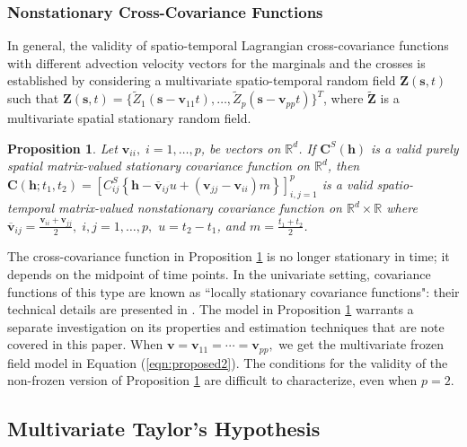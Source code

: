 \documentclass[12pt]{article}
\newcommand{\0}{\mathbf{0}}
\newtheorem{prop}{Proposition}
\begin{document}
\subsubsection{Nonstationary Cross-Covariance Functions}

In general, the validity of spatio-temporal Lagrangian cross-covariance functions with different advection velocity vectors for the marginals and the crosses is established by considering a multivariate spatio-temporal random field $\mathbf{Z}(\mathbf{s},t)$ such that $\mathbf{Z}(\mathbf{s},t)=\big\{\tilde{Z}_1\left(\mathbf{s}-\mathbf{v}_{11}t\right),\ldots,\tilde{Z}_p\left(\mathbf{s}-\mathbf{v}_{pp}t\right)\big\}^T$, where $\tilde{\mathbf{Z}}$ is a multivariate spatial stationary random field. 
\begin{prop}\label{corollary1}
Let $\mathbf{v}_{ii},\;i=1,\ldots,p$, be vectors on $\mathbb{R}^d$. If $\mathbf{C}^{S}(\mathbf{h})$ is a valid purely spatial matrix-valued stationary covariance function on $\mathbb{R}^d$, then $\mathbf{C}(\mathbf{h};t_1,t_2)=\left[C_{ij}^{S}\left\{\mathbf{h}-\overline{\mathbf{v}}_{ij}u+(\mathbf{v}_{jj}-\mathbf{v}_{ii})m\right\}\right]_{i,j=1}^{p}$ is a valid spatio-temporal matrix-valued nonstationary covariance function on $\mathbb{R}^d \times \mathbb{R}$ where $\overline{\mathbf{v}}_{ij}=\frac{\mathbf{v}_{ii}+\mathbf{v}_{jj}}{2},\;i,j=1,\ldots,p,$ $u=t_2-t_1$, and $m=\frac{t_1+t_2}{2}$.
\end{prop}

The cross-covariance function in Proposition \ref{corollary1} is no longer stationary in time; it depends on the midpoint of time points. In the univariate setting, covariance functions of this type are known as ``locally stationary covariance functions": their technical details are presented in \citet{genton2004time}. The model in Proposition \ref{corollary1} warrants a separate investigation on its properties and estimation techniques that are note covered in this paper. When $\mathbf{v}=\mathbf{v}_{11}=\cdots=\mathbf{v}_{pp},$ we get the multivariate frozen field model in Equation (\ref{eqn:proposed2}). The conditions for the validity of the non-frozen version of Proposition \ref{corollary1} are difficult to characterize, even when $p=2$. 



\subsection{Multivariate Taylor's Hypothesis}
\end{document}
